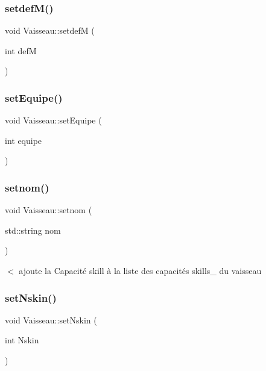 \mbox{\label{class_vaisseau_a4120a8c40229b8af08590ee3a6d00f6a}} 
\subsubsection{\texorpdfstring{setdef\+M()}{setdefM()}}
{\footnotesize\ttfamily void Vaisseau\+::setdefM (\begin{DoxyParamCaption}\item[{int}]{defM }\end{DoxyParamCaption})}

\mbox{\label{class_vaisseau_a1b3edda1f99d55cb5c0c7cbafe156af6}} 
\subsubsection{\texorpdfstring{set\+Equipe()}{setEquipe()}}
{\footnotesize\ttfamily void Vaisseau\+::set\+Equipe (\begin{DoxyParamCaption}\item[{int}]{equipe }\end{DoxyParamCaption})}

\mbox{\label{class_vaisseau_a46174e710a959996ac9ae56f11757e61}} 
\subsubsection{\texorpdfstring{setnom()}{setnom()}}
{\footnotesize\ttfamily void Vaisseau\+::setnom (\begin{DoxyParamCaption}\item[{std\+::string}]{nom }\end{DoxyParamCaption})}



$<$ ajoute la {\ttfamily Capacité} skill à la liste des capacités skills\+\_\+ du vaisseau 

\mbox{\label{class_vaisseau_a0d57458dc32dde2d8326c20f25172bab}} 
\subsubsection{\texorpdfstring{set\+Nskin()}{setNskin()}}
{\footnotesize\ttfamily void Vaisseau\+::set\+Nskin (\begin{DoxyParamCaption}\item[{int}]{Nskin }\end{DoxyParamCaption})}

